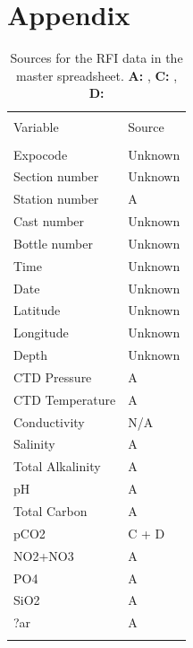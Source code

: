 \documentclass[journal, a4paper]{article} %
\begin{document}
\section{Appendix}



\begin{table}[H] \centering 
  \caption{Sources for the RFI data in the master spreadsheet. \textbf{A:} \protect{}, \textbf{C:} \protect{}, \textbf{D:} \protect{}}
  \label{t:RFIsources} 
\begin{tabular}{p{3cm}p{10cm}}%
\\[-1.8ex]\hline 
\hline \\[-1.8ex] 
 Variable & Source\\ 
\hline \\[-1.8ex] 
Expocode & Unknown\\[8pt] 
Section number & Unknown\\[8pt] 
Station number & A\\[8pt] 
Cast number & Unknown\\[8pt] 
Bottle number & Unknown\\[8pt] 
Time & Unknown\\[8pt] 
Date & Unknown\\[8pt] 
Latitude & Unknown\\[8pt] 
Longitude  & Unknown\\[8pt] 
Depth  & Unknown\\[8pt] 
CTD Pressure & A\\[8pt] 
CTD Temperature & A\\[8pt] 
Conductivity  & N/A\\[8pt] 
Salinity & A\\[8pt] 
Total Alkalinity & A\\[8pt] 
pH & A\\[8pt] 
Total Carbon & A\\[8pt] 
pCO2 & C + D\\[8pt] 
NO2+NO3 & A\\[8pt] 
PO4 & A\\[8pt] 
SiO2 & A\\[8pt] 
?ar & A\\[8pt] 
\hline \\[-1.8ex]
\end{tabular} 
\end{table} 
\end{document}
